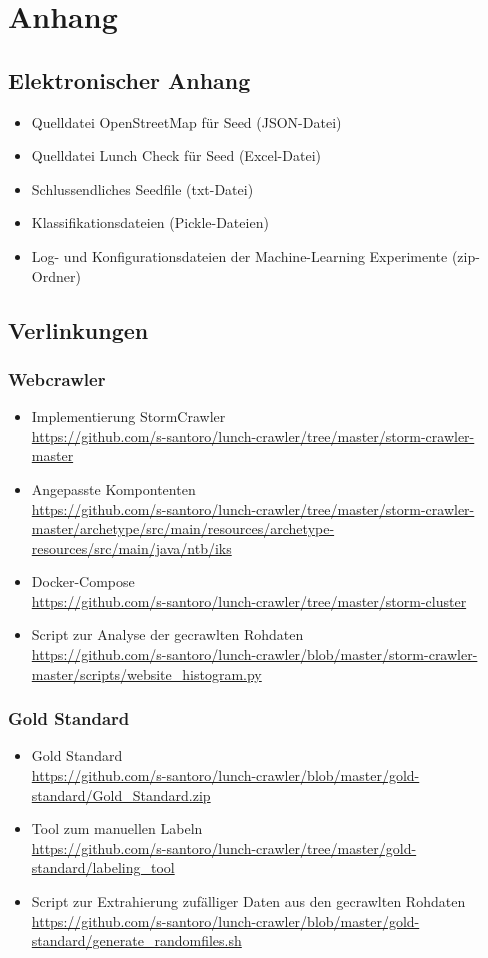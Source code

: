 \chapter{Anhang}
\section{Elektronischer Anhang}
\label{app:electronic}
\begin{itemize}
	\item Quelldatei OpenStreetMap für Seed (JSON-Datei)
	\item Quelldatei Lunch Check für Seed (Excel-Datei)
	\item Schlussendliches Seedfile (txt-Datei)
	\item Klassifikationsdateien (Pickle-Dateien)
	\item Log- und Konfigurationsdateien der Machine-Learning Experimente (zip-Ordner)
\end{itemize}
\section{Verlinkungen}
\subsection{Webcrawler}
\begin{itemize}
	\item Implementierung StormCrawler\\ \url{https://github.com/s-santoro/lunch-crawler/tree/master/storm-crawler-master}
	\item Angepasste Kompontenten\\
	\url{https://github.com/s-santoro/lunch-crawler/tree/master/storm-crawler-master/archetype/src/main/resources/archetype-resources/src/main/java/ntb/iks}
	\item Docker-Compose\\
	\url{https://github.com/s-santoro/lunch-crawler/tree/master/storm-cluster}
	\item Script zur Analyse der gecrawlten Rohdaten\\
	\url{https://github.com/s-santoro/lunch-crawler/blob/master/storm-crawler-master/scripts/website_histogram.py}
\end{itemize} 
\subsection{Gold Standard}
\label{app:gold_standard}
\begin{itemize}
	\item Gold Standard\\ 
	\url{https://github.com/s-santoro/lunch-crawler/blob/master/gold-standard/Gold_Standard.zip}
	\item Tool zum manuellen Labeln\\ 
	\url{https://github.com/s-santoro/lunch-crawler/tree/master/gold-standard/labeling_tool}
	\item Script zur Extrahierung zufälliger Daten aus den gecrawlten Rohdaten\\ 
	\url{https://github.com/s-santoro/lunch-crawler/blob/master/gold-standard/generate_randomfiles.sh}
\end{itemize} 
